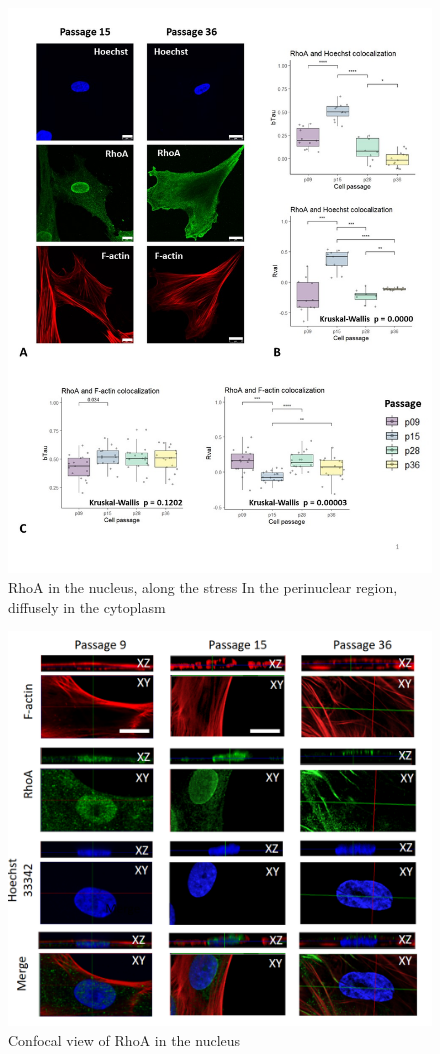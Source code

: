\documentclass[english,authoryear]{elsarticle}
\begin{document}
\begin{figure}
  \includegraphics[width=0.9\linewidth]{fig_rho-actin-col.jpg}
  \caption{RhoA in the nucleus, along the stress In the perinuclear region, diffusely in the cytoplasm}
  \label{rho-actin-col}
  \centering
\end{figure}



\begin{figure}
  \includegraphics[width=0.9\linewidth]{fig_rho-3d.png}
  \caption{Confocal view of RhoA in the nucleus}
  \label{rho-3d}
  \centering
\end{figure}
\end{document}
